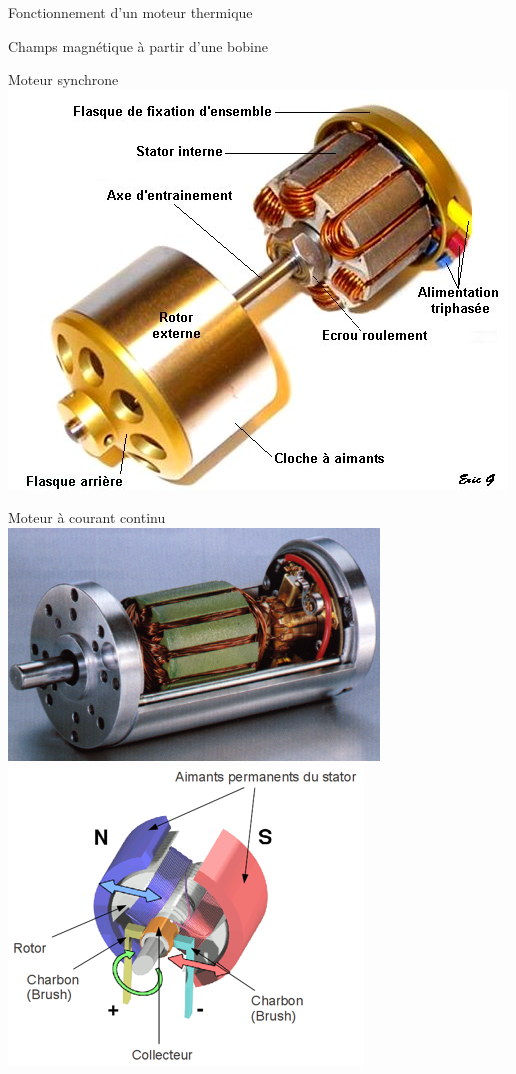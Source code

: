 \documentclass{beamer}
\begin{document}
\begin{frame}{Fonctionnement d'un moteur thermique}

\end{frame}


\begin{frame}{Champs magnétique à partir d'une bobine}
  \centering
\end{frame}

\begin{frame}{Moteur synchrone}
  \centering
  \includegraphics[width=.5\textwidth]{images/moteur11}
\end{frame}

\begin{frame}{Moteur à courant continu}
  \centering
  \includegraphics[width=.5\textwidth]{images/moteur_continu}\\
  \includegraphics[width=.5\textwidth]{images/moteur_continu_explose}
\end{frame}
\end{document}
